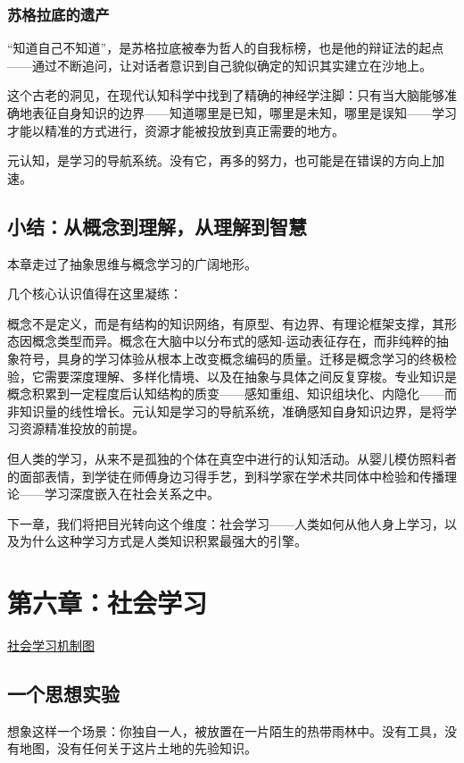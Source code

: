 \documentclass[11pt]{article}
\begin{document}
\subsubsection{苏格拉底的遗产}
\label{sec:org728c8c3}

“知道自己不知道”，是苏格拉底被奉为哲人的自我标榜，也是他的辩证法的起点——通过不断追问，让对话者意识到自己貌似确定的知识其实建立在沙地上。

这个古老的洞见，在现代认知科学中找到了精确的神经学注脚：只有当大脑能够准确地表征自身知识的边界——知道哪里是已知，哪里是未知，哪里是误知——学习才能以精准的方式进行，资源才能被投放到真正需要的地方。

元认知，是学习的导航系统。没有它，再多的努力，也可能是在错误的方向上加速。
\subsection{小结：从概念到理解，从理解到智慧}
\label{sec:org4ee15a4}

本章走过了抽象思维与概念学习的广阔地形。

几个核心认识值得在这里凝练：

概念不是定义，而是有结构的知识网络，有原型、有边界、有理论框架支撑，其形态因概念类型而异。概念在大脑中以分布式的感知-运动表征存在，而非纯粹的抽象符号，具身的学习体验从根本上改变概念编码的质量。迁移是概念学习的终极检验，它需要深度理解、多样化情境、以及在抽象与具体之间反复穿梭。专业知识是概念积累到一定程度后认知结构的质变——感知重组、知识组块化、内隐化——而非知识量的线性增长。元认知是学习的导航系统，准确感知自身知识边界，是将学习资源精准投放的前提。

但人类的学习，从来不是孤独的个体在真空中进行的认知活动。从婴儿模仿照料者的面部表情，到学徒在师傅身边习得手艺，到科学家在学术共同体中检验和传播理论——学习深度嵌入在社会关系之中。

下一章，我们将把目光转向这个维度：社会学习——人类如何从他人身上学习，以及为什么这种学习方式是人类知识积累最强大的引擎。
\section{第六章：社会学习}
\label{sec:org2daf9c8}

\href{file:///c:/Users/fupen/org/book/插图/社会学习机制图.png}{社会学习机制图}
\subsection{一个思想实验}
\label{sec:org532d343}

想象这样一个场景：你独自一人，被放置在一片陌生的热带雨林中。没有工具，没有地图，没有任何关于这片土地的先验知识。
\end{document}
